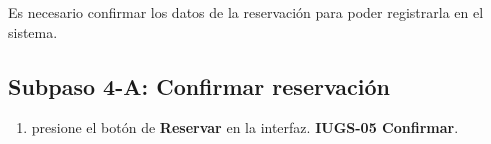 Es necesario confirmar los datos de la reservación para
poder registrarla en el sistema.

\subsection{Subpaso 4-A: Confirmar reservación}
\begin{enumerate}
	\item presione el botón de \textbf{Reservar} en la interfaz.
		\textbf{IUGS-05 Confirmar}.
\end{enumerate}
